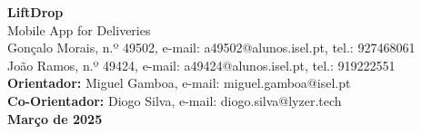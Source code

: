 \documentclass[a4paper,twoside,11pt]{article}
\begin{document}
\vspace{-15mm}
\begin{figure}[h]
\begin{center}
\end{center}
\end{figure}
\vspace{-8mm}

\begin{center}
    \LARGE \textbf{LiftDrop} \\ %
    \LARGE Mobile App for Deliveries \\ %
    \vspace{8mm}
    \large Gonçalo Morais, n.º 49502, e-mail: a49502@alunos.isel.pt, tel.: 927468061 \\
    \vspace{1mm}
    \large João Ramos, n.º 49424, e-mail: a49424@alunos.isel.pt, tel.: 919222551 \\
    \vspace{5mm}
    \large \textbf{Orientador:} Miguel Gamboa, e-mail: miguel.gamboa@isel.pt \\
    \vspace{3mm}
    \large \textbf{Co-Orientador:} Diogo Silva, e-mail: diogo.silva@lyzer.tech \\
    \vspace{5mm}
    \textbf{Março de 2025}
\end{center}

\vspace{10mm}
\end{document}
